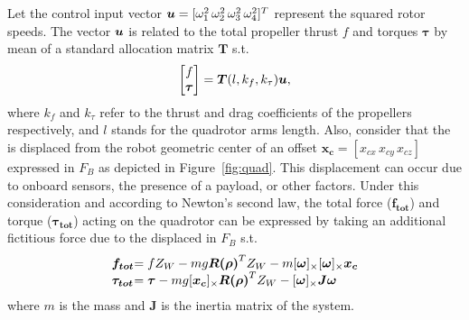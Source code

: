 Let the control input vector $\boldsymbol{u} = [\omega_{1}^2 \, \omega_{2}^2 \, \omega_{3}^2 \, \omega_{4}^2]^T$ represent the squared rotor speeds. 
The vector $\boldsymbol{u}$ is related to the total propeller thrust $f$ and torques $\boldsymbol{\tau}$ by mean of a standard allocation matrix $\boldsymbol{T}$ s.t.
\begin{equation}\label{eq:alloc_mat}
  \begin{bmatrix}
    f \\
    \boldsymbol{\tau}
    \end{bmatrix} = \boldsymbol{T}(l, k_f, k_{\tau}) \boldsymbol{u},
\end{equation}
where $k_f$ and $k_{\tau}$ refer to the thrust and drag coefficients of the propellers respectively, and $l$ stands for the quadrotor arms length.
Also, consider that the  is displaced from the robot geometric center of an offset $\boldsymbol{x_{c}} = [x_{cx} \, x_{cy} \, x_{cz}]$ expressed in $F_B$ as depicted in Figure~\ref{fig:quad}. 
This displacement can occur due to onboard sensors, the presence of a payload, or other factors.
Under this consideration and according to Newton's second law, the total force ($\boldsymbol{f_{tot}}$) and torque ($\boldsymbol{\tau_{tot}}$) acting on the quadrotor can be expressed by taking an additional fictitious force due to the displaced  in $F_B$ s.t. 
\begin{equation}\label{eq:quad_newton}
    \begin{array}{@{}l@{}l@{}}
        \boldsymbol{f_{tot}} &= f Z_W - mg\boldsymbol{R(\rho)}^TZ_W-m[\boldsymbol{\omega}]_{\times}[\boldsymbol{\omega}]_{\times}\boldsymbol{x_c} 
          
          \\
      
       \boldsymbol{\tau_{tot}} &= \boldsymbol{\tau}-mg[\boldsymbol{x_c}]_{\times}\boldsymbol{R(\rho)}^{T}Z_W - [\boldsymbol{\omega}]_{\times}\boldsymbol{J}\boldsymbol{\omega}
  \end{array}
\end{equation}
where $m$ is the mass and $\boldsymbol{J}$ is the inertia matrix of the system. 

